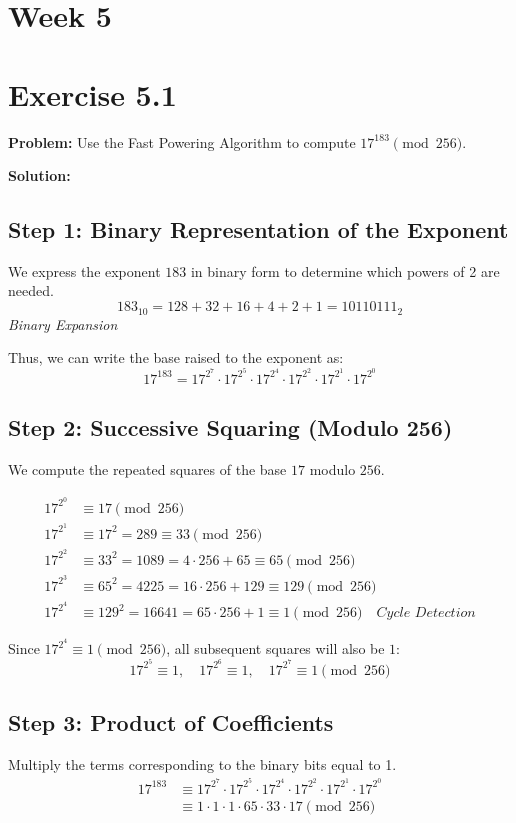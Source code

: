 \section*{Week 5}
\section*{Exercise 5.1}
\textbf{Problem:} Use the Fast Powering Algorithm to compute $17^{183} \pmod{256}$.

\textbf{Solution:}

\subsection*{Step 1: Binary Representation of the Exponent}
We express the exponent $183$ in binary form to determine which powers of 2 are needed.
$$ 183_{10} = 128 + 32 + 16 + 4 + 2 + 1 = 10110111_2 $$
\textit{Binary Expansion}

Thus, we can write the base raised to the exponent as:
$$ 17^{183} = 17^{2^7} \cdot 17^{2^5} \cdot 17^{2^4} \cdot 17^{2^2} \cdot 17^{2^1} \cdot 17^{2^0} $$

\subsection*{Step 2: Successive Squaring (Modulo 256)}
We compute the repeated squares of the base $17$ modulo $256$.

\begin{align*}
    17^{2^0} &\equiv 17 \pmod{256} \\
    17^{2^1} &\equiv 17^2 = 289 \equiv 33 \pmod{256} \\
    17^{2^2} &\equiv 33^2 = 1089 = 4 \cdot 256 + 65 \equiv 65 \pmod{256} \\
    17^{2^3} &\equiv 65^2 = 4225 = 16 \cdot 256 + 129 \equiv 129 \pmod{256} \\
    17^{2^4} &\equiv 129^2 = 16641 = 65 \cdot 256 + 1 \equiv 1 \pmod{256} \quad \textit{Cycle Detection}
\end{align*}

Since $17^{2^4} \equiv 1 \pmod{256}$, all subsequent squares will also be $1$:
$$ 17^{2^5} \equiv 1, \quad 17^{2^6} \equiv 1, \quad 17^{2^7} \equiv 1 \pmod{256} $$

\subsection*{Step 3: Product of Coefficients}
Multiply the terms corresponding to the binary bits equal to 1.
\begin{align*}
    17^{183} &\equiv 17^{2^7} \cdot 17^{2^5} \cdot 17^{2^4} \cdot 17^{2^2} \cdot 17^{2^1} \cdot 17^{2^0} \\
    &\equiv 1 \cdot 1 \cdot 1 \cdot 65 \cdot 33 \cdot 17 \pmod{256}
\end{align*}

